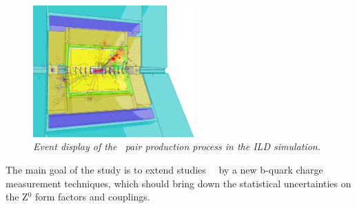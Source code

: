 \begin{figure}
	{\centering
		\includegraphics[clip, trim=0.cm 0cm 7.9cm 0cm, width=0.55\textwidth]{ILD/graphics/ild-ttbar.png}
		\caption{\sl Event display of the \ttbar\ pair production process in the ILD simulation.
		}
		\label{fig:TopEvent_3}
	}
	
\end{figure}

The main goal of the study is to extend studies~\cite{bib:ILCTOP}~\cite{bib:Jeremy} by a new b-quark charge measurement techniques, which should bring down the statistical uncertainties on the \ttbar Z$^0$ form factors and couplings.  



